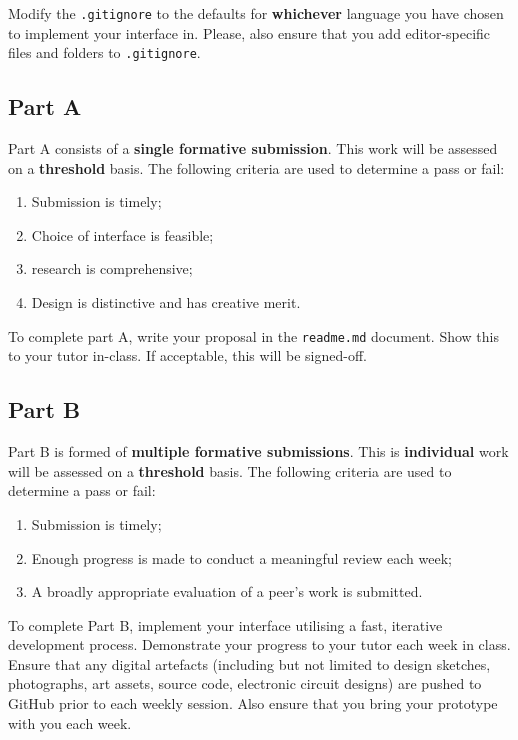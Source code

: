 \documentclass{../fal_assignment}
\begin{document}
Modify the \texttt{.gitignore} to the defaults for \textbf{whichever} language you have chosen to implement your interface in. Please, also ensure that you add editor-specific files and folders to \texttt{.gitignore}. 

\subsection*{Part A}

Part A consists of a \textbf{single formative submission}. This work will be assessed on a \textbf{threshold} basis. The following criteria are used to determine a pass or fail:

\begin{enumerate}[label=(\alph*)]
	\item Submission is timely;
	\item Choice of interface is feasible;
	\item research is comprehensive;
	\item Design is distinctive and has creative merit.
\end{enumerate}

To complete part A, write your proposal in the \texttt{readme.md} document. Show this to your tutor in-class. If acceptable, this will be signed-off.

\subsection*{Part B}

Part B is formed of \textbf{multiple formative submissions}. This is \textbf{individual} work will be assessed on a \textbf{threshold} basis. The following criteria are used to determine a pass or fail:

\begin{enumerate}[label=(\alph*)]
	\item Submission is timely;
	\item Enough progress is made to conduct a meaningful review each week;
	\item A broadly appropriate evaluation of a peer's work is submitted.
\end{enumerate}

To complete Part B, implement your interface utilising a fast, iterative development process. Demonstrate your progress to your tutor each week in class. Ensure that any digital artefacts (including but not limited to design sketches, photographs, art assets, source code, electronic circuit designs) are pushed to GitHub prior to each weekly session. Also ensure that you bring your prototype with you each week. 
\end{document}
